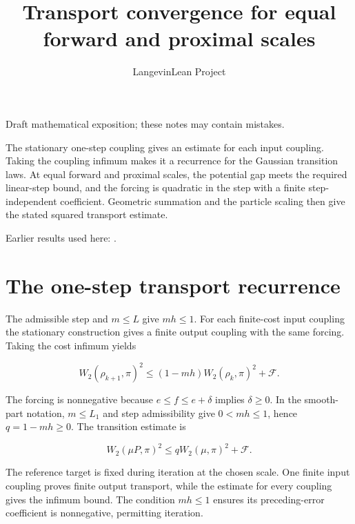 \documentclass[11pt,a4paper]{article}
\title{\texorpdfstring{Transport convergence for equal forward and proximal scales}{Transport convergence for equal forward and proximal scales}}
\author{LangevinLean Project}
\date{}
\begin{document}
\maketitle
Draft mathematical exposition; these notes may contain mistakes.


The stationary one-step coupling gives an estimate for each input coupling. Taking the coupling infimum makes it a recurrence for the Gaussian transition laws. At equal forward and proximal scales, the potential gap meets the required linear-step bound, and the forcing is quadratic in the step with a finite step-independent coefficient. Geometric summation and the particle scaling then give the stated squared transport estimate.




Earlier results used here: \cite[Section~3.15]{LangevinLean2026ULASC}.

\section{\texorpdfstring{The one-step transport recurrence}{The one-step transport recurrence}}


The admissible step and \(m\le L\) give \(mh\le1\). For each finite-cost input coupling the stationary construction gives a finite output coupling with the same forcing. Taking the cost infimum yields

\[W_2(\rho_{k+1},\pi)^2\le(1-mh)W_2(\rho_k,\pi)^2+\mathcal F.\]

The forcing is nonnegative because \(e\le f\le e+\delta\) implies \(\delta\ge0\). In the smooth-part notation, \(m\le L_1\) and step admissibility give \(0<mh\le1\), hence \(q=1-mh\ge0\). The transition estimate is

\[W_2(\mu P,\pi)^2\le qW_2(\mu,\pi)^2+\mathcal F.\]

The reference target is fixed during iteration at the chosen scale. One finite input coupling proves finite output transport, while the estimate for every coupling gives the infimum bound. The condition \(mh\le1\) ensures its preceding-error coefficient is nonnegative, permitting iteration.
\end{document}
